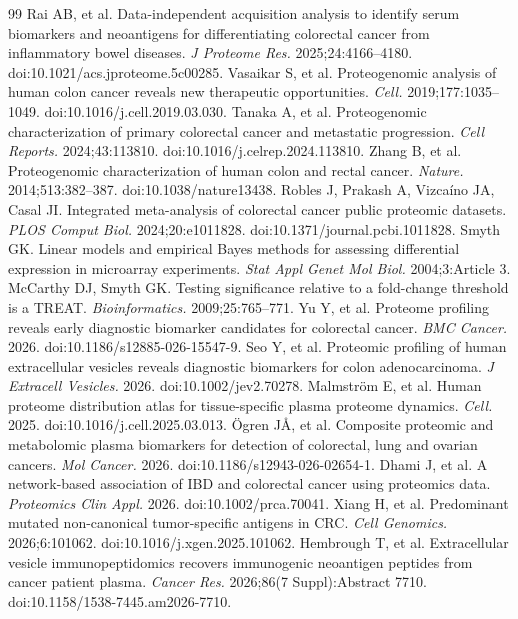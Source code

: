 \documentclass[11pt]{article}
\begin{document}
\begin{thebibliography}{99}
 Rai AB, et al. Data-independent acquisition analysis to identify serum biomarkers and neoantigens for differentiating colorectal cancer from inflammatory bowel diseases. \textit{J Proteome Res.} 2025;24:4166--4180. doi:10.1021/acs.jproteome.5c00285.
 Vasaikar S, et al. Proteogenomic analysis of human colon cancer reveals new therapeutic opportunities. \textit{Cell.} 2019;177:1035--1049. doi:10.1016/j.cell.2019.03.030.
 Tanaka A, et al. Proteogenomic characterization of primary colorectal cancer and metastatic progression. \textit{Cell Reports.} 2024;43:113810. doi:10.1016/j.celrep.2024.113810.
 Zhang B, et al. Proteogenomic characterization of human colon and rectal cancer. \textit{Nature.} 2014;513:382--387. doi:10.1038/nature13438.
 Robles J, Prakash A, Vizcaíno JA, Casal JI. Integrated meta-analysis of colorectal cancer public proteomic datasets. \textit{PLOS Comput Biol.} 2024;20:e1011828. doi:10.1371/journal.pcbi.1011828.
 Smyth GK. Linear models and empirical Bayes methods for assessing differential expression in microarray experiments. \textit{Stat Appl Genet Mol Biol.} 2004;3:Article 3.
 McCarthy DJ, Smyth GK. Testing significance relative to a fold-change threshold is a TREAT. \textit{Bioinformatics.} 2009;25:765--771.
 Yu Y, et al. Proteome profiling reveals early diagnostic biomarker candidates for colorectal cancer. \textit{BMC Cancer.} 2026. doi:10.1186/s12885-026-15547-9.
 Seo Y, et al. Proteomic profiling of human extracellular vesicles reveals diagnostic biomarkers for colon adenocarcinoma. \textit{J Extracell Vesicles.} 2026. doi:10.1002/jev2.70278.
 Malmström E, et al. Human proteome distribution atlas for tissue-specific plasma proteome dynamics. \textit{Cell.} 2025. doi:10.1016/j.cell.2025.03.013.
 Ögren JÅ, et al. Composite proteomic and metabolomic plasma biomarkers for detection of colorectal, lung and ovarian cancers. \textit{Mol Cancer.} 2026. doi:10.1186/s12943-026-02654-1.
 Dhami J, et al. A network-based association of IBD and colorectal cancer using proteomics data. \textit{Proteomics Clin Appl.} 2026. doi:10.1002/prca.70041.
 Xiang H, et al. Predominant mutated non-canonical tumor-specific antigens in CRC. \textit{Cell Genomics.} 2026;6:101062. doi:10.1016/j.xgen.2025.101062.
 Hembrough T, et al. Extracellular vesicle immunopeptidomics recovers immunogenic neoantigen peptides from cancer patient plasma. \textit{Cancer Res.} 2026;86(7 Suppl):Abstract 7710. doi:10.1158/1538-7445.am2026-7710.

\end{thebibliography}
\end{document}
